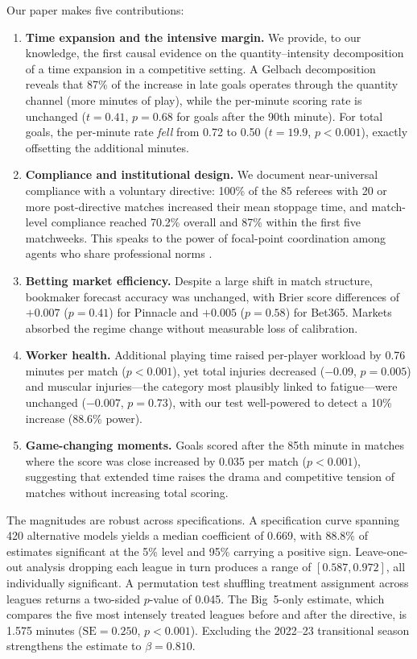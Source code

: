 Our paper makes five contributions:
\begin{enumerate}
    \item \textbf{Time expansion and the intensive margin.} We provide, to our knowledge, the first causal evidence on the quantity--intensity decomposition of a time expansion in a competitive setting. A Gelbach decomposition reveals that 87\% of the increase in late goals operates through the quantity channel (more minutes of play), while the per-minute scoring rate is unchanged ($t = 0.41$, $p = 0.68$ for goals after the 90th minute). For total goals, the per-minute rate \emph{fell} from 0.72 to 0.50 ($t = 19.9$, $p < 0.001$), exactly offsetting the additional minutes.
    \item \textbf{Compliance and institutional design.} We document near-universal compliance with a voluntary directive: 100\% of the 85 referees with 20 or more post-directive matches increased their mean stoppage time, and match-level compliance reached 70.2\% overall and 87\% within the first five matchweeks. This speaks to the power of focal-point coordination among agents who share professional norms \citep{Schelling1960}.
    \item \textbf{Betting market efficiency.} Despite a large shift in match structure, bookmaker forecast accuracy was unchanged, with Brier score differences of $+0.007$ ($p = 0.41$) for Pinnacle and $+0.005$ ($p = 0.58$) for Bet365. Markets absorbed the regime change without measurable loss of calibration.
    \item \textbf{Worker health.} Additional playing time raised per-player workload by 0.76 minutes per match ($p < 0.001$), yet total injuries decreased ($-0.09$, $p = 0.005$) and muscular injuries---the category most plausibly linked to fatigue---were unchanged ($-0.007$, $p = 0.73$), with our test well-powered to detect a 10\% increase (88.6\% power).
    \item \textbf{Game-changing moments.} Goals scored after the 85th minute in matches where the score was close increased by 0.035 per match ($p < 0.001$), suggesting that extended time raises the drama and competitive tension of matches without increasing total scoring.
\end{enumerate}

The magnitudes are robust across specifications. A specification curve spanning 420 alternative models yields a median coefficient of 0.669, with 88.8\% of estimates significant at the 5\% level and 95\% carrying a positive sign. Leave-one-out analysis dropping each league in turn produces a range of $[0.587, 0.972]$, all individually significant. A permutation test shuffling treatment assignment across leagues returns a two-sided $p$-value of 0.045. The Big~5-only estimate, which compares the five most intensely treated leagues before and after the directive, is 1.575 minutes ($\text{SE} = 0.250$, $p < 0.001$). Excluding the 2022--23 transitional season strengthens the estimate to $\beta = 0.810$.

